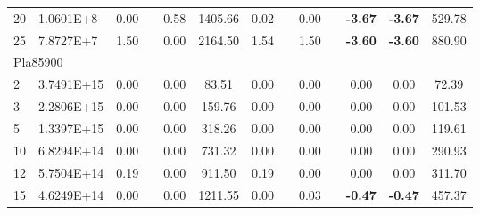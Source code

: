{\begin{longtable}{@{}llccccccccccc@{}}
\multicolumn{1}{l|}{20} & \multicolumn{1}{l|}{1.0601E+8}  & 0.00 & \multicolumn{1}{c|}{}    & 0.58 & \multicolumn{1}{c|}{1405.66}  & 0.02 & \multicolumn{1}{c|}{}    & 0.00 & \multicolumn{1}{c|}{}    & \textbf{-3.67}  & \textbf{-3.67}  & 529.78  \\
\multicolumn{1}{l|}{25} & \multicolumn{1}{l|}{7.8727E+7}  & 1.50 & \multicolumn{1}{c|}{}    & 0.00 & \multicolumn{1}{c|}{2164.50}  & 1.54 & \multicolumn{1}{c|}{}    & 1.50 & \multicolumn{1}{c|}{}    & \textbf{-3.60}  & \textbf{-3.60}  & 880.90  \\ \hline
\multicolumn{13}{l}{Pla85900}                                                                                                                                                                                                                        \\ \hline
\multicolumn{1}{l|}{2}  & \multicolumn{1}{l|}{3.7491E+15} & 0.00 & \multicolumn{1}{c|}{}    & 0.00 & \multicolumn{1}{c|}{83.51}    & 0.00 & \multicolumn{1}{c|}{}    & 0.00 & \multicolumn{1}{c|}{}    & 0.00            & 0.00            & 72.39   \\
\multicolumn{1}{l|}{3}  & \multicolumn{1}{l|}{2.2806E+15} & 0.00 & \multicolumn{1}{c|}{}    & 0.00 & \multicolumn{1}{c|}{159.76}   & 0.00 & \multicolumn{1}{c|}{}    & 0.00 & \multicolumn{1}{c|}{}    & 0.00            & 0.00            & 101.53  \\
\multicolumn{1}{l|}{5}  & \multicolumn{1}{l|}{1.3397E+15} & 0.00 & \multicolumn{1}{c|}{}    & 0.00 & \multicolumn{1}{c|}{318.26}   & 0.00 & \multicolumn{1}{c|}{}    & 0.00 & \multicolumn{1}{c|}{}    & 0.00            & 0.00            & 119.61  \\
\multicolumn{1}{l|}{10} & \multicolumn{1}{l|}{6.8294E+14} & 0.00 & \multicolumn{1}{c|}{}    & 0.00 & \multicolumn{1}{c|}{731.32}   & 0.00 & \multicolumn{1}{c|}{}    & 0.00 & \multicolumn{1}{c|}{}    & 0.00            & 0.00            & 290.93  \\
\multicolumn{1}{l|}{12} & \multicolumn{1}{l|}{5.7504E+14} & 0.19 & \multicolumn{1}{c|}{}    & 0.00 & \multicolumn{1}{c|}{911.50}   & 0.19 & \multicolumn{1}{c|}{}    & 0.00 & \multicolumn{1}{c|}{}    & 0.00            & 0.00            & 311.70  \\
\multicolumn{1}{l|}{15} & \multicolumn{1}{l|}{4.6249E+14} & 0.00 & \multicolumn{1}{c|}{}    & 0.00 & \multicolumn{1}{c|}{1211.55}  & 0.00 & \multicolumn{1}{c|}{}    & 0.03 & \multicolumn{1}{c|}{}    & \textbf{-0.47}  & \textbf{-0.47}  & 457.37  \\

\end{longtable}}
